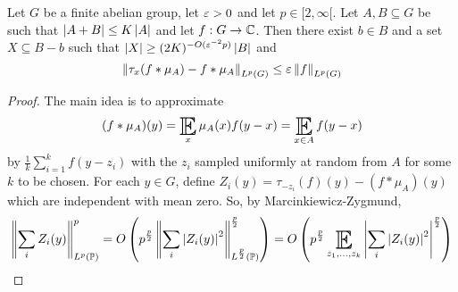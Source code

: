 \documentclass{article}
\begin{document}
\begin{thm}
  Let $G$ be a finite abelian group, let $\varepsilon > 0$ and let $p \in [2, \infty[$. Let $A, B \subseteq G$ be such that $\left\lvert A + B\right\rvert \le K\left\lvert A\right\rvert$ and let $f : G \to \mathbb C$. Then there exist $b \in B$ and a set $X \subseteq B - b$ such that $\left\lvert X\right\rvert \ge (2K)^{-O(\varepsilon^{-2}p)}\left\lvert B\right\rvert$ and
  $$\left\lVert \tau_x(f \ast \mu_A) - f \ast \mu_A\right\rVert_{L^p(G)} \le \varepsilon \left\lVert f\right\rVert_{L^p(G)}$$
\end{thm}
\begin{proof}
  The main idea is to approximate
  $$(f \ast \mu_A)(y) = \E_x \mu_A(x) f(y - x) = \E_{x \in A} f(y - x)$$
  by $\frac 1k \sum_{i = 1}^k f(y - z_i)$ with the $z_i$ sampled uniformly at random from $A$ for some $k$ to be chosen. For each $y \in G$, define $Z_i(y) = \tau_{-z_i}(f)(y) - (f \ast \mu_A)(y)$ which are independent with mean zero. So, by Marcinkiewicz-Zygmund,
  $$\norm{\sum_i Z_i(y)}_{L^p(\P)}^p = O\left(p^{\frac p2} \norm{\sum_i \abs{Z_i(y)}^2}_{L^{\frac p2}(\P)}^{\frac p2}\right) = O\left(p^{\frac p2} \E_{z_1, \dots, z_k} \abs{\sum_i \abs{Z_i(y)}^2}^{\frac p2}\right)$$

  \newlec
  

\end{proof}
\end{document}
